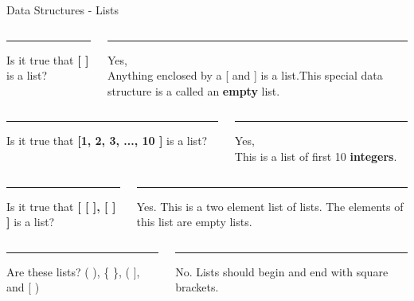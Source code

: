 \begin{frame}[fragile]{Data Structures - Lists}
  \begin{columns}[T]
    \begin{column}{.48\textwidth}
      \color{black}\rule{\linewidth}{0.5pt}
      Is it true that \textbf{[ ]} is a list? 
      \\
    \end{column}
    \hfill
    \pause
    \begin{column}{.48\textwidth}
      \color{red}\rule{\linewidth}{0.5pt}
      Yes, \\
      Anything enclosed by a [ and ]  is a list.This special data structure is a called an \textbf{empty} list.
    \end{column}
  \end{columns}
  \pause
  \vspace{1em}

  \begin{columns}[T]		
    \begin{column}{.48\textwidth}
      \color{black}\rule{\linewidth}{0.5pt}
      Is it true that \textbf{[1, 2, 3, ..., 10 ]} is a list? \\
    \end{column}
    \hfill
    \pause
    \begin{column}{.48\textwidth}
      \color{red}\rule{\linewidth}{0.5pt}
      Yes, \\
      This is a list of first 10 \textbf{integers}.
    \end{column}
    \pause
  \end{columns}
  \vspace{1em}

  \begin{columns}[T]		
    \begin{column}{.5\textwidth}
      \color{black}\rule{\linewidth}{0.5pt}
      Is it true that \textbf{[ [ ], [ ] ]} is a list? \\
    \end{column}
    \hfill
    \pause
    \begin{column}{.5\textwidth}
      \color{red}\rule{\linewidth}{0.5pt}
      Yes. This is a two element list of lists. The elements of this list are empty lists.
    \end{column}
    \pause
  \end{columns}
  \vspace{1em}

  \begin{columns}[T]		
    \begin{column}{.5\textwidth}
      \color{black}\rule{\linewidth}{0.5pt}
      Are these lists? ( ), \{ \}, ( ], and [ ) \\
    \end{column}
    \hfill
    \pause
    \begin{column}{.5\textwidth}
      \color{red}\rule{\linewidth}{0.5pt}
      No. Lists should begin and end with square brackets.
    \end{column}
  \end{columns}

\end{frame}
